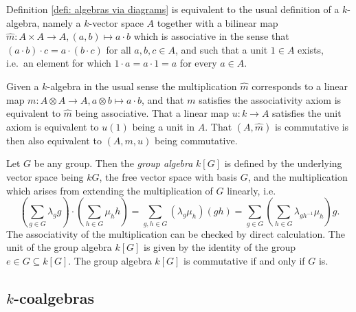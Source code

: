 \begin{rem}
 Definition \ref{defi: algebras via diagrams} is equivalent to the usual definition of a $k$-algebra, namely a $k$-vector space $A$ together with a bilinear map $\hat{m} \colon A \times A \to A, (a,b) \mapsto a \cdot b$ which is associative in the sense that $(a \cdot b) \cdot c = a \cdot (b \cdot c)$ for all $a,b,c \in A$, and such that a unit $1 \in A$ exists, i.e.\ an element for which $1 \cdot a = a \cdot 1 = a$ for every $a \in A$.
 
 Given a $k$-algebra in the usual sense the multiplication $\hat{m}$ corresponds to a linear map $m \colon A \otimes A \to A, a \otimes b \mapsto a \cdot b$, and that $m$ satisfies the associativity axiom is equivalent to $\hat{m}$ being associative. That a linear map $u \colon k \to A$ satisfies the unit axiom is equivalent to $u(1)$ being a unit in $A$. That $(A,\hat{m})$ is commutative is then also equivalent to $(A,m,u)$ being commutative.
\end{rem}


\begin{expl}
 Let $G$ be any group. Then the \emph{group algebra} $k[G]$ is defined by the underlying vector space being $kG$, the free vector space with basis $G$, and the multiplication which arises from extending the multiplication of $G$ linearly, i.e.
 \[
  \left( \sum_{g \in G} \lambda_g g \right) \cdot \left( \sum_{h \in G} \mu_h h \right)
  = \sum_{g,h \in G} (\lambda_g \mu_h) (gh)
  = \sum_{g \in G} \left( \sum_{h \in G} \lambda_{gh^{-1}} \mu_h \right) g.
 \]
 The associativity of the multiplication can be checked by direct calculation. The unit of the group algebra $k[G]$ is given by the identity of the group $e \in G \subseteq k[G]$. The group algebra $k[G]$ is commutative if and only if $G$ is.
\end{expl}





\subsection{\texorpdfstring{$k$}{k}-coalgebras}


